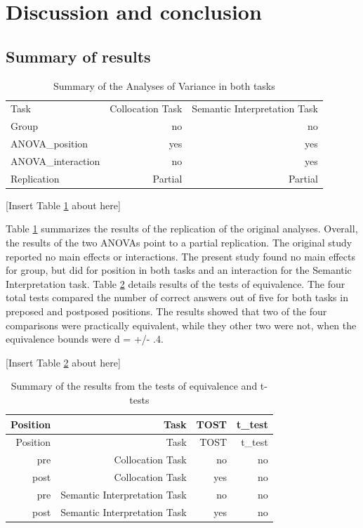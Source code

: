 \documentclass[
  man]{apa6}
\begin{document}
\hypertarget{discussion-and-conclusion}{%
\section{Discussion and conclusion}\label{discussion-and-conclusion}}

\hypertarget{summary-of-results}{%
\subsection{Summary of results}\label{summary-of-results}}

\begin{longtable}[]{@{}lrr@{}}
\caption{\label{tab:summaryanovas}Summary of the Analyses of Variance in both tasks}\tabularnewline
\toprule
\endhead
Task & Collocation Task & Semantic Interpretation Task \\
Group & no & no \\
ANOVA\_position & yes & yes \\
ANOVA\_interaction & no & yes \\
Replication & Partial & Partial \\
\bottomrule
\end{longtable}

{[}Insert Table \ref{tab:summaryanovas} about here{]}

Table \ref{tab:summaryanovas} summarizes the results of the replication of the original analyses.
Overall, the results of the two ANOVAs point to a partial replication.
The original study reported no main effects or interactions.
The present study found no main effects for group, but did for position in both tasks and an interaction for the Semantic Interpretation task.
Table \ref{tab:summaryttests} details results of the tests of equivalence.
The four total tests compared the number of correct answers out of five for both tasks in preposed and postposed positions.
The results showed that two of the four comparisons were practically equivalent, while they other two were not, when the equivalence bounds were d = +/- .4.

{[}Insert Table \ref{tab:summaryttests} about here{]}

\begin{longtable}[]{@{}rrrr@{}}
\caption{\label{tab:summaryttests}Summary of the results from the tests of equivalence and t-tests}\tabularnewline
\toprule
Position & Task & TOST & t\_test \\
\midrule
\endfirsthead
\toprule
Position & Task & TOST & t\_test \\
\midrule
\endhead
pre & Collocation Task & no & no \\
post & Collocation Task & yes & no \\
pre & Semantic Interpretation Task & no & no \\
post & Semantic Interpretation Task & yes & no \\
\bottomrule
\end{longtable}
\end{document}
